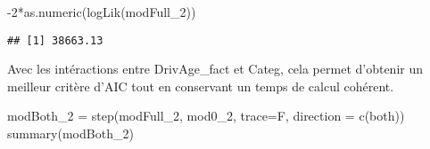 \documentclass[
]{article}
\newenvironment{Shaded}{\begin{snugshade}}{\end{snugshade}}
\newcommand{\AttributeTok}[1]{\textcolor[rgb]{0.77,0.63,0.00}{#1}}
\newcommand{\DecValTok}[1]{\textcolor[rgb]{0.00,0.00,0.81}{#1}}
\newcommand{\FunctionTok}[1]{\textcolor[rgb]{0.00,0.00,0.00}{#1}}
\newcommand{\NormalTok}[1]{#1}
\newcommand{\OtherTok}[1]{\textcolor[rgb]{0.56,0.35,0.01}{#1}}
\newcommand{\SpecialCharTok}[1]{\textcolor[rgb]{0.00,0.00,0.00}{#1}}
\newcommand{\StringTok}[1]{\textcolor[rgb]{0.31,0.60,0.02}{#1}}
\begin{document}
\begin{Shaded}
\begin{Highlighting}[]
\SpecialCharTok{{-}}\DecValTok{2}\SpecialCharTok{*}\FunctionTok{as.numeric}\NormalTok{(}\FunctionTok{logLik}\NormalTok{(modFull\_2))}
\end{Highlighting}
\end{Shaded}

\begin{verbatim}
## [1] 38663.13
\end{verbatim}

Avec les intéractions entre DrivAge\_fact et Categ, cela permet
d'obtenir un meilleur critère d'AIC tout en conservant un temps de
calcul cohérent.

\begin{Shaded}
\begin{Highlighting}[]
\NormalTok{modBoth\_2 }\OtherTok{=} \FunctionTok{step}\NormalTok{(modFull\_2, mod0\_2, }\AttributeTok{trace=}\NormalTok{F, }\AttributeTok{direction =} \FunctionTok{c}\NormalTok{(}\StringTok{\textquotesingle{}both\textquotesingle{}}\NormalTok{))}
\FunctionTok{summary}\NormalTok{(modBoth\_2)}
\end{Highlighting}
\end{Shaded}
\end{document}
